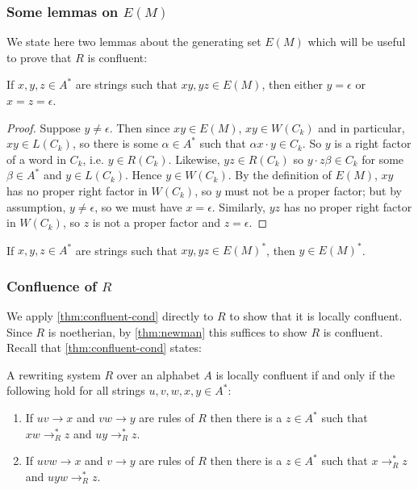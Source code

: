 \documentclass[noindex,noinsetproof,12pt]{lmaths}
\begin{document}
\subsubsection{\texorpdfstring{Some lemmas on $E(M)$}{Some lemmas on E(M)}}

We state here two lemmas about the generating set $E(M)$ which will be useful to prove that $R$ is confluent:

\begin{lemma} \label{lma:no-middle-E(M)}
	If $x, y, z \in A^*$ are strings such that $xy, yz \in E(M)$, then either $y = \epsilon$ or $x = z = \epsilon$.
\end{lemma}
\begin{proof}
	Suppose $y \ne \epsilon$. Then since $xy \in E(M)$, $xy \in W(C_k)$ and in particular, $xy \in L(C_k)$, so there is some $\alpha \in A^*$ such that $\alpha x \cdot y \in C_k$. So $y$ is a right factor of a word in $C_k$, i.e. $y \in R(C_k)$. Likewise, $yz \in R(C_k)$ so $y \cdot z\beta \in C_k$ for some $\beta \in A^*$ and $y \in L(C_k)$. Hence $y \in W(C_k)$. By the definition of $E(M)$, $xy$ has no proper right factor in $W(C_k)$, so $y$ must not be a proper factor; but by assumption, $y \ne \epsilon$, so we must have $x = \epsilon$. Similarly, $yz$ has no proper right factor in $W(C_k)$, so $z$ is not a proper factor and $z = \epsilon$.
\end{proof}

\begin{cly} \label{cly:middle-E(M)*}
	If $x, y, z \in A^*$ are strings such that $xy, yz \in E(M)^*$, then $y \in E(M)^*$.
\end{cly}


\subsubsection{\texorpdfstring{Confluence of $R$}{Confluence of R}}

We apply \cref{thm:confluent-cond} directly to $R$ to show that it is locally confluent. Since $R$ is noetherian, by \cref{thm:newman} this suffices to show $R$ is confluent. Recall that \cref{thm:confluent-cond} states:

\begin{theorem*}
	A rewriting system $R$ over an alphabet $A$ is locally confluent if and only if the following hold for all strings $u, v, w, x, y \in A^*$:
	\begin{enumerate}[(1)]
		\item If $uv \to x$ and $vw \to y$ are rules of $R$ then there is a $z \in A^*$ such that $xw \to^*_R z$ and $uy \to^*_R z$.
		\item If $uvw \to x$ and $v \to y$ are rules of $R$ then there is a $z \in A^*$ such that $x \to^*_R z$ and $uyw \to^*_R z$.
	\end{enumerate}
\end{theorem*}
\end{document}

